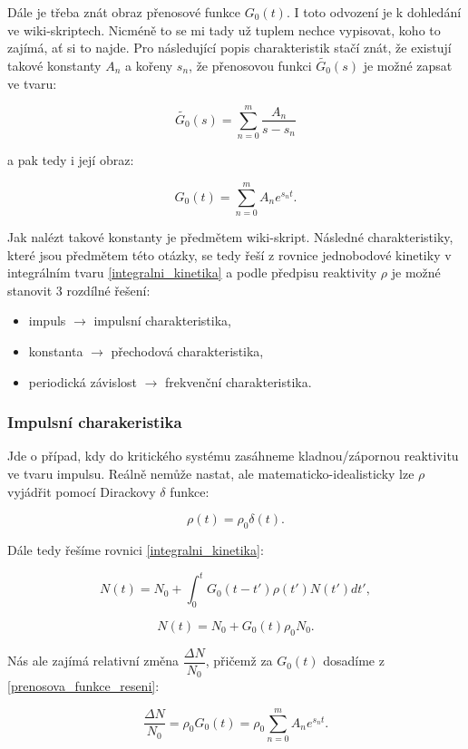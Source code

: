 Dále je třeba znát obraz přenosové funkce $G_0(t)$. I toto odvození je k dohledání ve wiki-skriptech. Nicméně to se mi tady už tuplem nechce vypisovat, koho to zajímá, ať si to najde. Pro následující popis charakteristik stačí znát, že existují takové konstanty $A_n$ a kořeny $s_n$, že přenosovou funkci $\tilde{G_0}(s)$ je možné zapsat ve tvaru:

$$ \tilde{G_0}(s) = \sum_{n=0}^m \dfrac{A_n}{s-s_n} $$

a pak tedy i její obraz:

\begin{equation}
    \boxed{
    G_0(t) = \sum_{n=0}^m A_n e^{s_n t}.
    \label{prenosova_funkce_reseni}
    }
\end{equation}

Jak nalézt takové konstanty je předmětem wiki-skript. Následné charakteristiky, které jsou předmětem této otázky, se tedy řeší z rovnice jednobodové kinetiky v integrálním tvaru \eqref{integralni_kinetika} a podle předpisu reaktivity $\rho$ je možné stanovit 3 rozdílné řešení:

\begin{itemize}
    \item impuls $\rightarrow$ impulsní charakteristika,
    \item konstanta $\rightarrow$ přechodová charakteristika,
    \item periodická závislost $\rightarrow$ frekvenční charakteristika.
\end{itemize}

\subsubsection{Impulsní charakeristika}

Jde o případ, kdy do kritického systému zasáhneme kladnou/zápornou reaktivitu ve tvaru impulsu. Reálně nemůže nastat, ale matematicko-idealisticky lze $\rho$ vyjádřit pomocí Dirackovy $\delta$ funkce:

$$ \rho(t) = \rho_0 \delta (t). $$

Dále tedy řešíme rovnici \eqref{integralni_kinetika}:

$$ N(t) = N_0 + \int_0^t G_0(t-t') \rho(t') N(t')dt', $$

$$ N(t) = N_0 + G_0(t) \rho_0 N_0. $$

Nás ale zajímá relativní změna $\dfrac{\Delta N}{N_0}$, přičemž za $G_0(t)$ dosadíme z \eqref{prenosova_funkce_reseni}:

\begin{equation}
  \boxed{
  \dfrac{\Delta N}{N_0} = \rho_0 G_0 (t) = \rho_0 \sum_{n=0}^m A_n e^{s_n t}.
  \label{impulsni_charakteristika}}
\end{equation}

